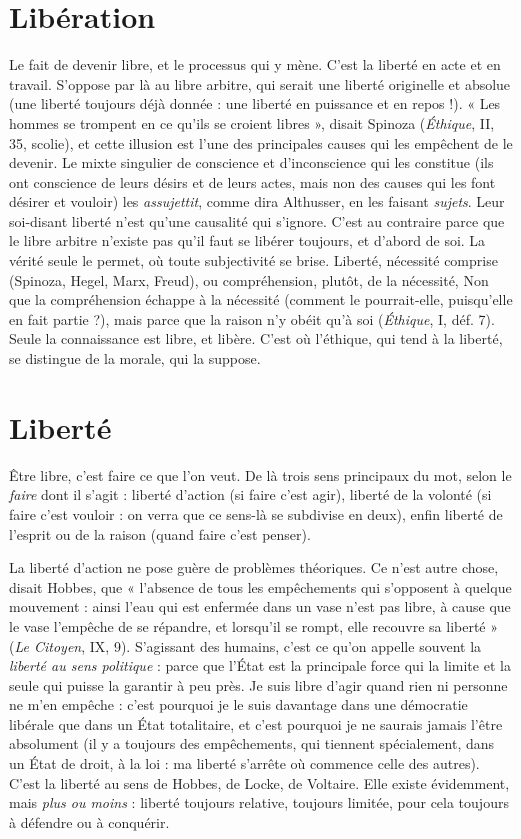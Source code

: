 {\section{Libération}
Le fait de devenir libre, et le processus qui y mène. C’est la
liberté en acte et en travail. S’oppose par là au libre arbitre,
qui serait une liberté originelle et absolue (une liberté toujours déjà donnée :
une liberté en puissance et en repos !). « Les hommes se trompent en ce qu’ils
se croient libres », disait Spinoza ({\it Éthique}, II, 35, scolie), et cette illusion est
l’une des principales causes qui les empêchent de le devenir. Le mixte singulier
de conscience et d’inconscience qui les constitue (ils ont conscience de leurs
désirs et de leurs actes, mais non des causes qui les font désirer et vouloir) les
{\it assujettit}, comme dira Althusser, en les faisant {\it sujets}. Leur soi-disant liberté
n'est qu'une causalité qui s’ignore. C’est au contraire parce que le libre arbitre
n'existe pas qu'il faut se libérer toujours, et d’abord de soi. La vérité seule le
permet, où toute subjectivité se brise. Liberté, nécessité comprise (Spinoza,
Hegel, Marx, Freud), ou compréhension, plutôt, de la nécessité, Non que la
compréhension échappe à la nécessité (comment le pourrait-elle, puisqu’elle en
fait partie ?), mais parce que la raison n’y obéit qu’à soi ({\it Éthique}, I, déf. 7).
Seule la connaissance est libre, et libère. C’est où l'éthique, qui tend à la liberté,
se distingue de la morale, qui la suppose.

\section{Liberté}
Être libre, c’est faire ce que l’on veut. De là trois sens principaux
du mot, selon le {\it faire} dont il s’agit : liberté d’action (si faire c’est
agir), liberté de la volonté (si faire c’est vouloir : on verra que ce sens-là se subdivise
en deux), enfin liberté de l’esprit ou de la raison (quand faire c’est
penser).

La liberté d’action ne pose guère de problèmes théoriques. Ce n’est autre
chose, disait Hobbes, que « l’absence de tous les empêchements qui s’opposent
à quelque mouvement : ainsi l’eau qui est enfermée dans un vase n’est pas libre,
à cause que le vase l'empêche de se répandre, et lorsqu'il se rompt, elle recouvre
sa liberté » ({\it Le Citoyen}, IX, 9). S'agissant des humains, c’est ce qu’on appelle
souvent la {\it liberté au sens politique} : parce que l’État est la principale force qui la
limite et la seule qui puisse la garantir à peu près. Je suis libre d’agir quand rien
ni personne ne m'en empêche : c’est pourquoi je le suis davantage dans une
démocratie libérale que dans un État totalitaire, et c’est pourquoi je ne saurais
jamais l’être absolument (il y a toujours des empêchements, qui tiennent spécialement,
dans un État de droit, à la loi : ma liberté s’arrête où commence celle
des autres). C’est la liberté au sens de Hobbes, de Locke, de Voltaire. Elle existe
évidemment, mais {\it plus ou moins} : liberté toujours relative, toujours limitée,
pour cela toujours à défendre ou à conquérir.

}
